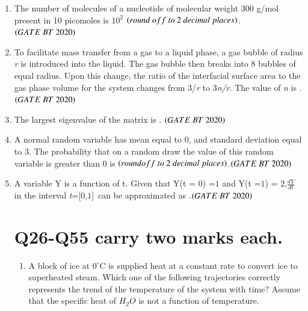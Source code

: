 \documentclass[journal,12pt,onecolumn]{IEEEtran}
\theoremstyle{remark}
\begin{document}
\begin{enumerate}[label=Q\arabic*:]
\item The number of molecules of a nucleotide of molecular weight 300 g/mol present in 10 picomoles is $10^2$ $\brak{round \ off \ to\ 2 \ decimal\ places}$.
\hfill$\brak{GATE\ BT\ 2020}$\\

\item To facilitate mass transfer from a gas to a liquid phase, a gas bubble of radius \textit{r} is introduced into the liquid. The gas bubble then breaks into 8 bubbles of equal radius. Upon this change, the ratio of the interfacial surface area to the gas phase volume for the system changes from $3$/\textit{r} to $3$\textit{n/r}. The value of \textit{n} is  . \hfill$\brak{GATE\ BT\ 2020}$\\

\item The largest eigenvalue of the matrix 
is  . \hfill$\brak{GATE\ BT\ 2020}$\\

\item A normal random variable has mean equal to 0, and standard deviation equal to 3. The probability that on a random draw the value of this random variable is greater than 0 is    $\brak{roundoff\ to\ 2\ decimal\ places}$.\hfill$\brak{GATE\ BT\ 2020}$\\

\item A variable Y is a function of t. Given that Y(t = $0$) =$ 1$ and Y(t =$ 1$) = $2$,$\frac{dY}{dt}$ in the interval \textit{t}=[$0$,$1$]\ can be approximated as .\hfill$\brak{GATE\ BT\ 2020}$

\section{Q26-Q55 carry two marks each.}
\begin{enumerate}[label=Q\arabic*:, start=26, leftmargin=2em]
\item  A block of ice at $0^{\circ}\mathrm{C}$  is supplied heat at a constant rate to convert ice to superheated steam. Which one of the following trajectories correctly represents the trend of the temperature of the system with time? Assume that the specific heat of $H_2O$ is not a function of temperature.
\begin{multicols}{2}
\begin{enumerate}[label=\alph*)]


\end{enumerate}
\end{multicols}
\end{enumerate}
\end{enumerate}
\end{document}
